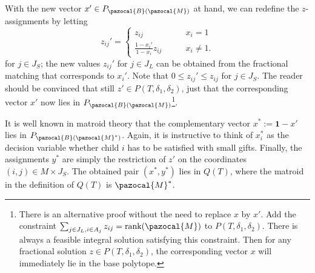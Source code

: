 
With the new vector $x' \in P_{\pazocal{B}(\pazocal{M})}$ at hand, we can redefine the $z$-assignments by letting
\[ 
  z_{ij}' = 
\begin{cases}
z_{ij} & \qquad x_i = 1\\ 
\frac{1-x_i'}{1-x_i} z_{ij} & \qquad x_i \neq 1.
\end{cases} 
\]
for $j \in J_S$; the new values $z_{ij}'$ for $j \in J_L$ can be obtained from the fractional matching
that corresponds to $x_i'$. Note that $0 \leq z_{ij}' \leq z_{ij}$ for $j \in J_S$. The reader should be convinced that
still $z' \in P(T,\delta_1,\delta_2)$, just that the corresponding vector $x'$ now lies in $P_{\pazocal{B}(\pazocal{M})}$\footnote{There is an alternative proof without the need to replace $x$ by $x'$. Add the constraint $\sum_{j \in J_L, i \in A_j} z_{ij} = \textrm{rank}(\pazocal{M})$
to $P(T,\delta_1, \delta_2)$. There is always a feasible integral solution satisfying this constraint. Then for any fractional solution $z \in P(T,\delta_1,\delta_2)$, the corresponding vector $x$ will immediately lie in the base polytope.}.


It is well known in matroid theory that  
the complementary vector $x^* := \mathbf{1} - x'$ lies in $P_{\pazocal{B}(\pazocal{M}^*)}$. 
Again, it is instructive to think of $x^*_i$ as the decision variable whether 
child $i$ has to be satisfied with small gifts.
Finally, the assignments $y^*$ are simply the restriction of $z'$ on the 
coordinates $(i,j) \in M \times J_S$.
The obtained pair $(x^*,y^*)$ lies in $Q(T)$, where the matroid in the definition 
of $Q(T)$ is $\pazocal{M}^*$.




